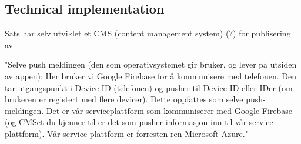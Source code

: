 \subsection{Technical implementation}
Sats har selv utviklet et CMS (content management system) (?) for publisering av 



"Selve push meldingen (den som operativsystemet gir bruker, og lever på utsiden av appen); Her bruker vi Google Firebase for å kommunisere med telefonen. Den tar utgangspunkt i Device ID (telefonen) og pusher til Device ID eller IDer (om brukeren er registert med flere devicer). Dette oppfattes som selve push-meldingen. Det er vår serviceplattform som kommuniserer med Google Firebase (og CMSet du kjenner til er det som pusher informasjon inn til vår service plattform). Vår service plattform er forresten ren Microsoft Azure."


